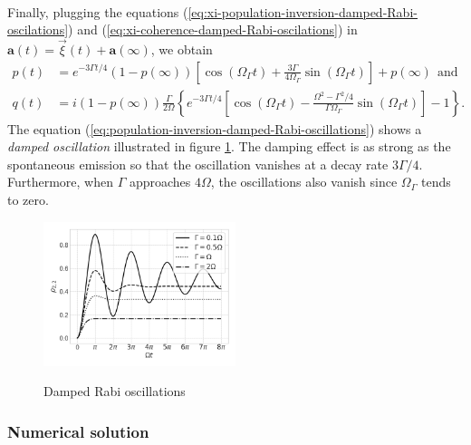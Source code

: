 {\begin{align}
	\label{eq:xi-coherence-damped-Rabi-oscilations}
\end{align}
Finally, plugging the equations (\ref{eq:xi-population-inversion-damped-Rabi-oscilations}) and (\ref{eq:xi-coherence-damped-Rabi-oscilations}) in $ \mathbf{a}(t) = \vec{\xi}(t) + \mathbf{a}(\infty) $, we obtain
\begin{align}
	p(t) &= e^{-3\Gamma t / 4}(1 - p(\infty))\left[\cos(\Omega_{\Gamma}t) + \frac{3\Gamma}{4 \Omega_{\Gamma}} \sin(\Omega_{\Gamma}t) \right] + p(\infty)\ \ \textrm{and}
	\label{eq:population-inversion-damped-Rabi-oscillations}
	\\
	q(t) &= i(1 - p(\infty)) \frac{\Gamma}{2\Omega} \left\{ e^{-3\Gamma t / 4} \left[\cos(\Omega_{\Gamma}t) - \frac{\Omega^2 - \Gamma^2 / 4}{\Gamma \Omega_{\Gamma}} \sin(\Omega_{\Gamma}t) \right] - 1 \right\}.
	\label{eq:coherence-damped-Rabi-oscillations}
\end{align}
The equation (\ref{eq:population-inversion-damped-Rabi-oscillations}) shows a \textit{damped oscillation} illustrated in figure \ref{fig:damped-Rabi-oscillations}. The damping effect is as strong as the spontaneous emission so that the oscillation vanishes at a decay rate $ 3\Gamma/4 $. Furthermore, when $ \Gamma $ approaches $ 4\Omega $, the oscillations also vanish since $ \Omega_{\Gamma} $ tends to zero.

\begin{figure}[!ht]
	\centering
	\caption{Damped Rabi oscillations}
	\vspace{-10pt}
	\includegraphics[width=0.5\textwidth]{USPSC-img/Damped_Rabi_oscillations.png}
	\label{fig:damped-Rabi-oscillations}
	\vspace{-15pt}
\end{figure}

\subsubsection{Numerical solution}
\label{sec:numerical-solution}

}
